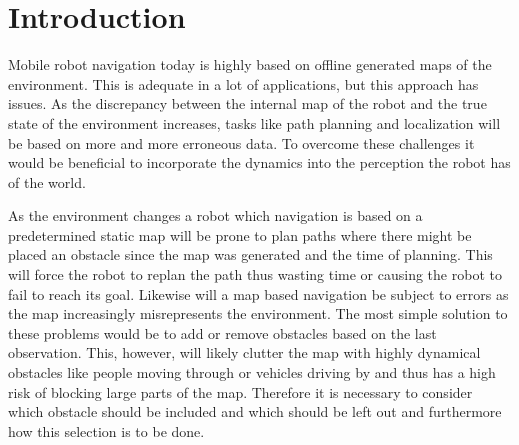 \chapter{Introduction}

Mobile robot navigation today is highly based on offline generated maps of the environment. 
This is adequate in a lot of applications, but this approach has issues. 
As the discrepancy between the internal map of the robot and the true state of the environment increases, tasks like path planning and localization will be based on more and more erroneous data. 
To overcome these challenges it would be beneficial to incorporate the dynamics into the perception the robot has of the world.

As the environment changes a robot which navigation is based on a predetermined static map will be prone to plan paths where there might be placed an obstacle since the map was generated and the time of planning. 
This will force the robot to replan the path thus wasting time or causing the robot to fail to reach its goal. Likewise will a map based navigation be subject to errors as the map increasingly misrepresents the environment. 
The most simple solution to these problems would be to add or remove obstacles based on the last observation. This, however, will likely clutter the map with highly dynamical obstacles like people moving through or vehicles driving by and thus has a high risk of blocking large parts of the map. 
Therefore it is necessary to consider which obstacle should be included and which should be left out and furthermore how this selection is to be done.

